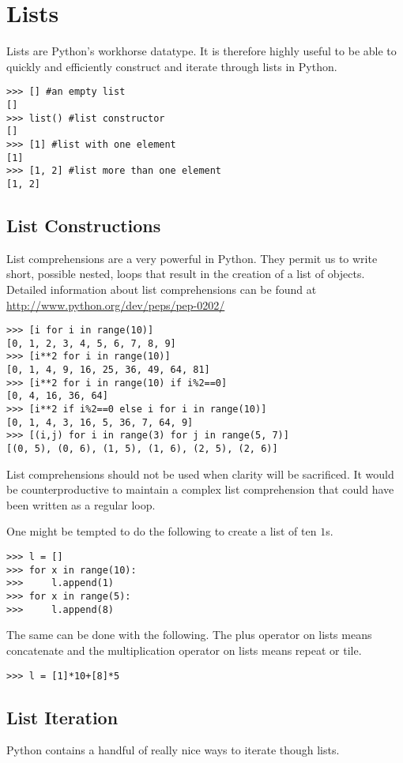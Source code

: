 \section*{Lists}
Lists are Python's workhorse datatype.  It is therefore highly useful to be able to quickly and efficiently construct and iterate through lists in Python.
\begin{lstlisting}
>>> [] #an empty list
[]
>>> list() #list constructor
[]
>>> [1] #list with one element
[1]
>>> [1, 2] #list more than one element
[1, 2]
\end{lstlisting}

\subsection*{List Constructions}
List comprehensions are a very powerful in Python.  They permit us to write short, possible nested, loops that result in the creation of a list of objects.  Detailed information about list comprehensions can be found at \url{http://www.python.org/dev/peps/pep-0202/}
\begin{lstlisting}
>>> [i for i in range(10)]
[0, 1, 2, 3, 4, 5, 6, 7, 8, 9]
>>> [i**2 for i in range(10)]
[0, 1, 4, 9, 16, 25, 36, 49, 64, 81]
>>> [i**2 for i in range(10) if i%2==0]
[0, 4, 16, 36, 64]
>>> [i**2 if i%2==0 else i for i in range(10)]
[0, 1, 4, 3, 16, 5, 36, 7, 64, 9]
>>> [(i,j) for i in range(3) for j in range(5, 7)]
[(0, 5), (0, 6), (1, 5), (1, 6), (2, 5), (2, 6)]
\end{lstlisting}
List comprehensions should not be used when clarity will be sacrificed.  It would be counterproductive to maintain a complex list comprehension that could have been written as a regular  loop.

One might be tempted to do the following to create a list of ten $1$s.
\begin{lstlisting}
>>> l = []
>>> for x in range(10):
>>>     l.append(1)
>>> for x in range(5):
>>>     l.append(8)
\end{lstlisting}
The same can be done with the following.  The plus operator on lists means concatenate and the
multiplication operator on lists means repeat or tile.
\begin{lstlisting}
>>> l = [1]*10+[8]*5
\end{lstlisting}

\subsection*{List Iteration}
Python contains a handful of really nice ways to iterate though lists.

